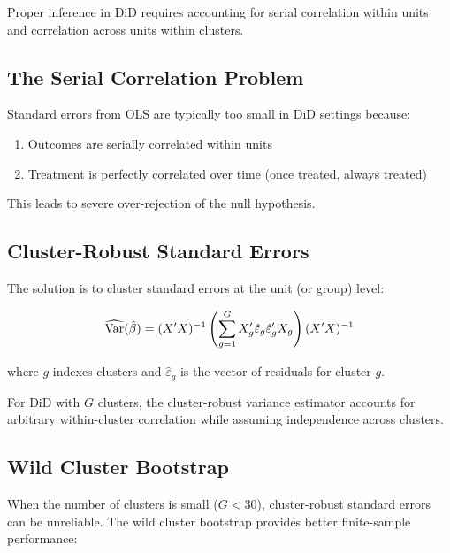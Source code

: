 Proper inference in DiD requires accounting for serial correlation within units and correlation across units within clusters.

\subsection{The Serial Correlation Problem}

\begin{theorem}
\label{thm:bertrand}
Standard errors from OLS are typically too small in DiD settings because:
\begin{enumerate}
    \item Outcomes are serially correlated within units
    \item Treatment is perfectly correlated over time (once treated, always treated)
\end{enumerate}
This leads to severe over-rejection of the null hypothesis.
\end{theorem}

\subsection{Cluster-Robust Standard Errors}

The solution is to cluster standard errors at the unit (or group) level:

\begin{equation}
\widehat{\mathrm{Var}}(\hat{\beta}) = (X'X)^{-1} \left( \sum_{g=1}^{G} X_g' \hat{\varepsilon}_g \hat{\varepsilon}_g' X_g \right) (X'X)^{-1}
\label{eq:cluster_se}
\end{equation}

where $g$ indexes clusters and $\hat{\varepsilon}_g$ is the vector of residuals for cluster $g$.

\begin{definition}
For DiD with $G$ clusters, the cluster-robust variance estimator accounts for arbitrary within-cluster correlation while assuming independence across clusters.
\end{definition}

\subsection{Wild Cluster Bootstrap}

When the number of clusters is small ($G < 30$), cluster-robust standard errors can be unreliable. The wild cluster bootstrap provides better finite-sample performance:

